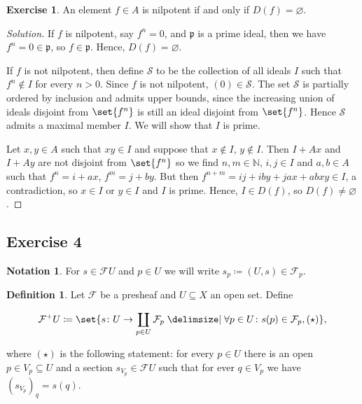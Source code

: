 \documentclass[a4paper]{amsbook}
\theoremstyle{definition}
\newtheorem*{definition*}{Definition}
\newtheorem*{exercise*}{Exercise}
\newtheorem*{notation*}{Notation}
\begin{document}
\begin{exercise*}
\label{SecondPart}
An element $f \in A$ is nilpotent if and only if $D(f) = \varnothing$.
\end{exercise*}
\begin{proof}[Solution]
If $f$ is nilpotent, say $f^n = 0$, and $\mathfrak{p}$ is a prime ideal, then we have
$f^n = 0 \in \mathfrak{p}$, so $f \in \mathfrak{p}$. Hence, $D(f) = \varnothing$.

If  $f$ is not nilpotent, then define $\mathcal{S}$ to be the collection of all
ideals $I$ such that $f^n\notin I$ for every $n > 0$. Since $f$ is not nilpotent,
$(0) \in \mathcal{S}$. The set $\mathcal{S}$ is partially ordered by inclusion
and admits upper bounds, since the increasing union of ideals disjoint from $\set{f^n}$ is
still an ideal disjoint from $\set{f^n}$. Hence $\mathcal{S}$ admits a maximal member
$I$. We will show that $I$ is prime.

Let $x, y \in A$ such that $xy \in I$ and suppose that $x\notin I$, $y\notin I$.
Then $I + Ax$ and $I + Ay$ are not disjoint from $\set{f^n}$ so we find
$n, m \in \mathbb{N}$, $i, j \in I$ and $a, b \in A$ such that
$f^n = i + ax$,  $f^m = j + by$. But then $f^{n+m} = ij + iby + jax + abxy \in I$,
a contradiction, so $x \in I$ or $y \in I$ and $I$ is prime. Hence, $I \in D(f)$,
so $D(f) \neq \varnothing$.
\end{proof}


\subsection*{Exercise 4}
\label{Ex4}
\begin{notation*}
\label{StalkNotation}
For $s \in \mathcal{F}U$ and $p \in U$ we will write
$s_p \coloneqq (U, s) \in \mathcal{F}_p$.
\end{notation*}

\begin{definition*}
\label{AssociatedSheaf}
Let $\mathcal{F}$ be a presheaf and $U \subseteq X$ an open set.
Define

\[ \mathcal{F}^+U\coloneqq \set{s\colon U\to \coprod_{p \in U}\mathcal{F}_p\given \forall p \in U\colon s(p) \in \mathcal{F}_p, (\star)}, \]

where $(\star)$ is the following statement: for every $p \in U$ there is an open
$p \in V_p \subseteq U$ and a section $s_{V_p} \in \mathcal{F}U$ such that
for ever $q \in V_p$ we have $(s_{V_p})_q = s(q)$.
\end{definition*}
\end{document}
